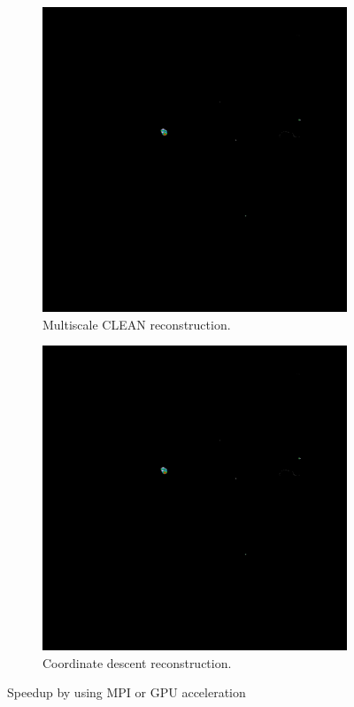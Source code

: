 \begin{figure}[h]
	\centering
	\begin{subfigure}[b]{0.4\linewidth}
		\includegraphics[width=1.00\linewidth]{./chapters/10.results/cleancomp/cd.png}
		\caption{Multiscale CLEAN reconstruction.}
		\label{results:comp:clean}
	\end{subfigure}
	\begin{subfigure}[b]{0.40\linewidth}
		\includegraphics[width=1.00\linewidth]{./chapters/10.results/cleancomp/cd.png}
		\caption{Coordinate descent reconstruction.}
		\label{results:comp:cd}
	\end{subfigure}
	\caption{Speedup by using MPI or GPU acceleration}
	\label{results:cleancomp:figure}
\end{figure}

